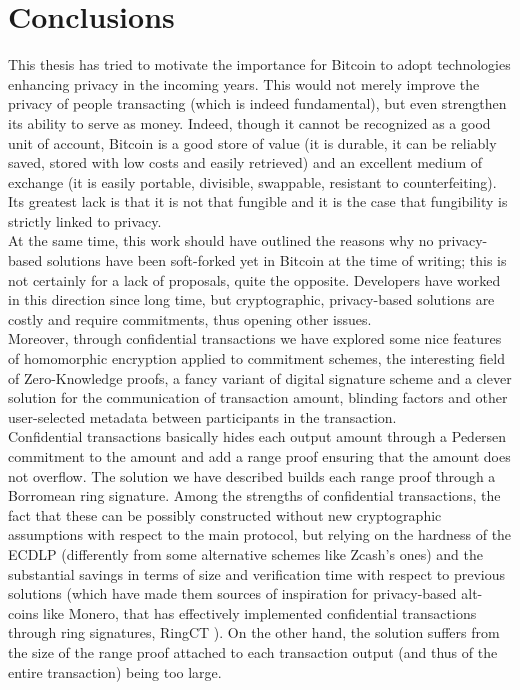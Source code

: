 \chapter{Conclusions}
\label{chpr:conclusions}
This thesis has tried to motivate the importance for Bitcoin to adopt technologies enhancing privacy in the incoming years. This would not merely improve the privacy of people transacting (which is indeed fundamental), but even strengthen its ability to serve as money. Indeed, though it cannot be recognized as a good unit of account, Bitcoin is a good store of value (it is durable, it can be reliably saved, stored with low costs and easily retrieved) and an excellent medium of exchange (it is easily portable, divisible, swappable, resistant to counterfeiting). Its greatest lack is that it is not that fungible and it is the case that fungibility is strictly linked to privacy.\\
At the same time, this work should have outlined the reasons why no privacy-based solutions have been soft-forked yet in Bitcoin at the time of writing; this is not certainly for a lack of proposals, quite the opposite. Developers have worked in this direction since long time, but cryptographic, privacy-based solutions are costly and require commitments, thus opening other issues.\\
Moreover, through confidential transactions \cite{Max15} we have explored some nice features of homomorphic encryption applied to commitment schemes, the interesting field of Zero-Knowledge proofs, a fancy variant of digital signature scheme and a clever solution for the communication of transaction amount, blinding factors and other user-selected metadata between participants in the transaction.\\
Confidential transactions basically hides each output amount through a Pedersen commitment to the amount and add a range proof ensuring that the amount does not overflow. The solution we have described builds each range proof through a Borromean ring signature. Among the strengths of confidential transactions, the fact that these can be possibly constructed without new cryptographic assumptions with respect to the main protocol, but relying on the hardness of the ECDLP (differently from some alternative schemes like Zcash's ones) and the substantial savings in terms of size and verification time with respect to previous solutions (which have made them sources of inspiration for privacy-based alt-coins like Monero, that has effectively implemented confidential transactions through ring signatures, RingCT \cite{RingCTMonero}). On the other hand, the solution suffers from the size of the range proof attached to each transaction output (and thus of the entire transaction) being too large.\\
